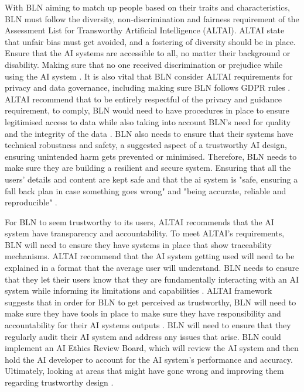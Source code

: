 \documentclass[a4paper,10pt]{article}
\begin{document}
	With BLN aiming to match up people based on their traits and characteristics, BLN must follow the diversity, non-discrimination and fairness requirement of the Assessment List for Transworthy Artificial Intelligence (ALTAI).  ALTAI state that unfair bias must get avoided, and a fostering of diversity should be in place. Ensure that the AI systems are accessible to all, no matter their background or disability. Making sure that no one received discrimination or prejudice while using the AI system \cite{ALTAI_ws}. It is also vital that BLN consider ALTAI  requirements for privacy and data governance, including making sure BLN follows GDPR rules \cite{gdpr}. ALTAI recommend that to be entirely respectful of the privacy and guidance requirement, to comply, BLN would need to have procedures in place to ensure legitimised access to data while also taking into account BLN's need for quality and the integrity of the data \cite{ALTAI_ws}. BLN also needs to ensure that their systems have technical robustness and safety, a suggested aspect of a trustworthy AI design, ensuring unintended harm gets prevented or minimised. Therefore, BLN needs to make sure they are building a resilient and secure system. Ensuring that all the users' details and content are kept safe and that the ai system is "safe, ensuring a fall back plan in case something goes wrong" and "being accurate, reliable and reproducible" \cite{ALTAI_ws}. 
	
	For BLN to seem trustworthy to its users, ALTAI recommends that the AI system have transparency and accountability. To meet ALTAI's requirements, BLN will need to ensure they have systems in place that show traceability mechanisms. ALTAI recommend that the AI system getting used will need to be explained in a format that the average user will understand. BLN needs to ensure that they let their users know that they are fundamentally interacting with an AI system while informing its limitations and capabilities \cite{ALTAI_ws}. ALTAI framework suggests that in order for BLN to get perceived as trustworthy, BLN will need to make sure they have tools in place to make sure they have responsibility and accountability for their AI systems outputs \cite{ALTAI_ws}. BLN will need to ensure that they regularly audit their AI system and address any issues that arise. BLN could implement an AI Ethics Review Board, which will review the AI system and then hold the AI developer to account for the AI system's performance and accuracy. Ultimately, looking at areas that might have gone wrong and improving them regarding trustworthy design \cite{ALTAI_ws}.
	
\end{document}
